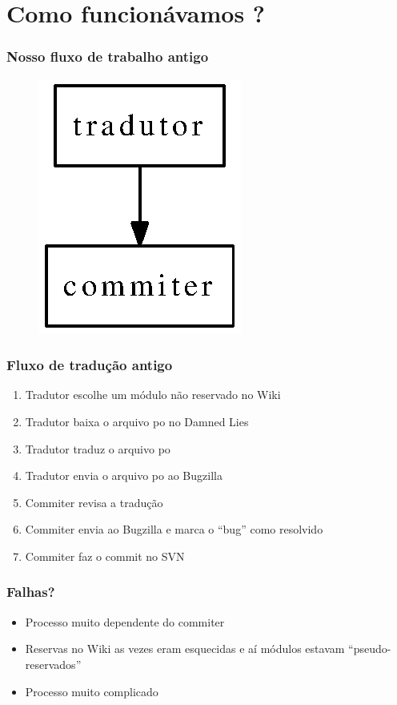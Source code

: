 \documentclass{beamer}
\begin{document}
\section{Como funcionávamos ?}

\begin{frame}
    \frametitle{Nosso fluxo de trabalho antigo}
    \begin{figure}[ht]
        \includegraphics{figures/fluxo_antigo.eps}     
    \end{figure}
\end{frame}

\begin{frame}
    \frametitle{Fluxo de tradução antigo}
    \begin{enumerate}[<+->]
        \item Tradutor escolhe um módulo não reservado no Wiki
        \item Tradutor baixa o arquivo po no Damned Lies
        \item Tradutor traduz o arquivo po
        \item Tradutor envia o arquivo po ao Bugzilla
        \item Commiter revisa a tradução 
        \item Commiter envia ao Bugzilla e marca o ``bug'' como resolvido
        \item Commiter faz o commit no SVN
    \end{enumerate}
\end{frame}

\begin{frame}
    \frametitle{Falhas?}
    \begin{itemize}[<+->]
        \item Processo muito dependente do commiter
        \item Reservas no Wiki as vezes eram esquecidas e aí módulos estavam ``pseudo-reservados''
        \item Processo muito complicado
    \end{itemize}
\end{frame}
\end{document}

